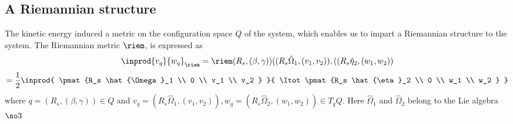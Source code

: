 \documentclass[11pt]{article}                %
\begin{document}
\subsection{A Riemannian structure}
%
		The kinetic energy induced a metric on the configuration space $Q$ of the
		system, which enables us to impart a Riemannian structure
		to the system. The Riemannian metric $\riem$, 
	      is expressed as 
	        \begin{align}
	             \inprod{v_q}{w_q}_{\riem} = \riem (R_s, (\beta, \gamma)) ((R_s \hat{\Omega}_1 , (v_1, v_2)),
	                                                           ((R_s \hat{\eta}_2 , (w_1, w_2))       
	        \end{align}
	        \begin{align}
	                       =  \frac{1}{2} \inprod{  \pmat{R_s \hat{\Omega}_1 \\ 0 \\ v_1 \\ v_2 }   }
	                         { \Itot   \pmat{R_s \hat{\eta}_2 \\ 0 \\ w_1 \\  w_2 }     }                                                                             
	        \end{align}
		where $q = (R_s, (\beta, \gamma)) \in Q $ and $v_q = (R_s\hat{\Omega}_1, (v_1,v_2)), 
		w_q = (R_s\hat{\Omega}_2, (w_1,w_2)) \in T_qQ$. Here $\hat{\Omega}_1$ and
		$ \hat{\Omega}_2$
		belong to the Lie algebra $\so3$
\end{document}
